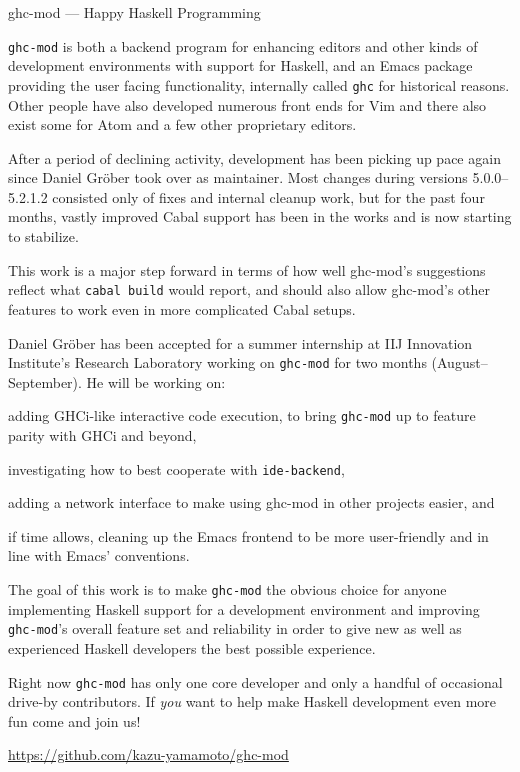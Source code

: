 \begin{hcarentry}[updated]{ghc-mod --- Happy Haskell Programming}
\makeheader

\texttt{ghc-mod} is both a backend program for enhancing editors and other kinds
of development environments with support for Haskell, and an Emacs package
providing the user facing functionality, internally called \texttt{ghc} for
historical reasons. Other people have also developed numerous front ends for Vim
and there also exist some for Atom and a few other proprietary editors.

After a period of declining activity, development has been picking up pace again
since Daniel Gr\"ober took over as maintainer. Most changes during versions
5.0.0--5.2.1.2 consisted only of fixes and internal cleanup work, but for the
past four months, vastly improved Cabal support has been in the works and is now
starting to stabilize.

This work is a major step forward in terms of how well ghc-mod's suggestions
reflect what \texttt{cabal build} would report, and should also allow ghc-mod's
other features to work even in more complicated Cabal setups.

Daniel Gr\"ober has been accepted for a summer internship at IIJ Innovation
Institute's Research Laboratory working on \texttt{ghc-mod} for two months
(August--September). He will be working on:
\begin{compactitem}

  \item adding GHCi-like interactive code execution, to bring \texttt{ghc-mod} up
    to feature parity with GHCi and beyond,

  \item investigating how to best cooperate with \texttt{ide-backend},

  \item adding a network interface to make using ghc-mod in other projects
    easier, and

  \item if time allows, cleaning up the Emacs frontend to be more user-friendly
    and in line with Emacs' conventions.
\end{compactitem}

The goal of this work is to make \texttt{ghc-mod} the obvious choice for anyone
implementing Haskell support for a development environment and improving
\texttt{ghc-mod}'s overall feature set and reliability in order to give new as
well as experienced Haskell developers the best possible experience.

Right now \texttt{ghc-mod} has only one core developer and only a handful of
occasional drive-by contributors. If \textit{you} want to help make Haskell
development even more fun come and join us!

\FurtherReading
  \url{https://github.com/kazu-yamamoto/ghc-mod}
\end{hcarentry}
